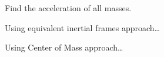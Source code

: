 \documentclass[main.tex]{subfiles}
\begin{document}
\begin{ex}{2.1}
Find the acceleration of all masses.
\end{ex}

\begin{sol}
Using equivalent inertial frames approach\dots


\noindent Using Center of Mass approach\dots
\end{sol}
\end{document}
